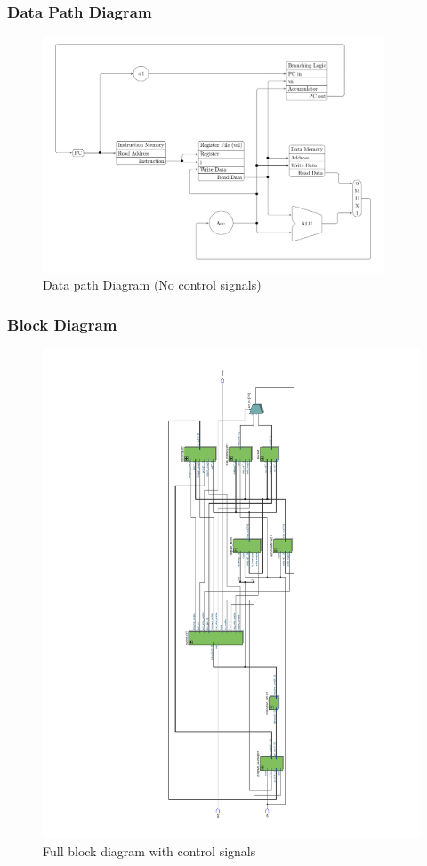
	\begin{frame}
		\frametitle{Data Path Diagram}

		\begin{figure}[h]
			\includegraphics[height=7cm]{data-path-diagram}
			\caption{Data path Diagram (No control signals)}
		\end{figure}
	\end{frame}

	\begin{frame}
		\frametitle{Block Diagram}
		\begin{figure}[h]
			\includegraphics[angle=270, trim={7cm 1.5cm 7cm 1.5cm}, width=\textwidth]{block-diagram}
			\caption{Full block diagram with control signals}
		\end{figure}
	\end{frame}

